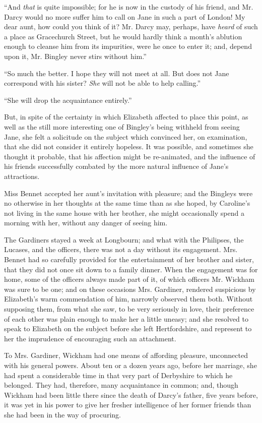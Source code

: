 ``And \textit{that} is quite impossible; for he is now in the custody of his friend, and Mr. Darcy would no more suffer him to call on Jane in such a part of London! My dear aunt, how could you think of it? Mr. Darcy may, perhaps, have \textit{heard} of such a place as Gracechurch Street, but he would hardly think a month's ablution enough to cleanse him from its impurities, were he once to enter it; and, depend upon it, Mr. Bingley never stirs without him.''

``So much the better. I hope they will not meet at all. But does not Jane correspond with his sister? \textit{She} will not be able to help calling.''

``She will drop the acquaintance entirely.''

But, in spite of the certainty in which Elizabeth affected to place this point, as well as the still more interesting one of Bingley's being withheld from seeing Jane, she felt a solicitude on the subject which convinced her, on examination, that she did not consider it entirely hopeless. It was possible, and sometimes she thought it probable, that his affection might be re-animated, and the influence of his friends successfully combated by the more natural influence of Jane's attractions.

Miss Bennet accepted her aunt's invitation with pleasure; and the Bingleys were no otherwise in her thoughts at the same time than as she hoped, by Caroline's not living in the same house with her brother, she might occasionally spend a morning with her, without any danger of seeing him.

The Gardiners stayed a week at Longbourn; and what with the Philipses, the Lucases, and the officers, there was not a day without its engagement. Mrs. Bennet had so carefully provided for the entertainment of her brother and sister, that they did not once sit down to a family dinner. When the engagement was for home, some of the officers always made part of it, of which officers Mr. Wickham was sure to be one; and on these occasions Mrs. Gardiner, rendered suspicious by Elizabeth's warm commendation of him, narrowly observed them both. Without supposing them, from what she saw, to be very seriously in love, their preference of each other was plain enough to make her a little uneasy; and she resolved to speak to Elizabeth on the subject before she left Hertfordshire, and represent to her the imprudence of encouraging such an attachment.

To Mrs. Gardiner, Wickham had one means of affording pleasure, unconnected with his general powers. About ten or a dozen years ago, before her marriage, she had spent a considerable time in that very part of Derbyshire to which he belonged. They had, therefore, many acquaintance in common; and, though Wickham had been little there since the death of Darcy's father, five years before, it was yet in his power to give her fresher intelligence of her former friends than she had been in the way of procuring.

